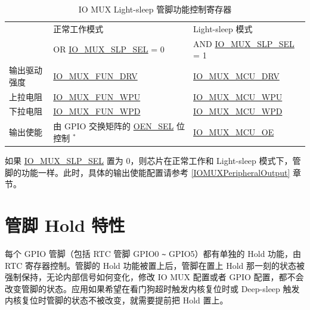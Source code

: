 \documentclass[main\_\_CN.tex]{subfiles}
\begin{document}
\begin{longtable}[c]{|p{3cm}|m{6.5cm}|m{5cm}|}
\caption{IO MUX Light-sleep 管脚功能控制寄存器}
\label{tab:iomuxgpio-pin-function-register-light-sleep-mode} \\
    \hline
    \rowcolor{lightgray}
   & 正常工作模式 & Light-sleep 模式 \\
    \rowcolor{lightgray}
   \multirow{-2}{*}{IO MUX 功能}  & OR \hyperref[fielddesc:IOMUXGPIONSLPSEL]{IO\_MUX\_SLP\_SEL} = 0 & AND \hyperref[fielddesc:IOMUXGPIONSLPSEL]{IO\_MUX\_SLP\_SEL} = 1 \\
    \hline
输出驱动强度 & \hyperref[fielddesc:IOMUXGPIONFUNDRV]{IO\_MUX\_FUN\_DRV} & \hyperref[fielddesc:IOMUXGPIONMCUDRV]{IO\_MUX\_MCU\_DRV} \\ 
\hline
上拉电阻 & \hyperref[fielddesc:IOMUXGPIONFUNWPU]{IO\_MUX\_FUN\_WPU} & \hyperref[fielddesc:IOMUXGPIONMCUWPU]{IO\_MUX\_MCU\_WPU} \\
\hline
下拉电阻 & \hyperref[fielddesc:IOMUXGPIONFUNWPD]{IO\_MUX\_FUN\_WPD} & \hyperref[fielddesc:IOMUXGPIONMCUWPD]{IO\_MUX\_MCU\_WPD} \\
\hline
输出使能 & 由 GPIO 交换矩阵的 \hyperref[fielddesc:GPIOFUNCNOENSEL]{OEN\_SEL} 位控制 $^{*}$ & \hyperref[fielddesc:IOMUXGPIONMCUOE]{IO\_MUX\_MCU\_OE} \\
\hline
\end{longtable}

\begin{tiplisting}
如果 \hyperref[fielddesc:IOMUXGPIONSLPSEL]{IO\_MUX\_SLP\_SEL} 置为 0，则芯片在正常工作和 Light-sleep 模式下，管脚的功能一样。此时，具体的输出使能配置请参考 \ref{IOMUXPeripheralOutput} 章节。

\end{tiplisting}

\section{管脚 Hold 特性}\label{PadHold}

每个 GPIO 管脚（包括 RTC 管脚 GPIO0 \verb+~+ GPIO5）都有单独的 Hold 功能，由 RTC 寄存器控制。管脚的 Hold 功能被置上后，管脚在置上 Hold 那一刻的状态被强制保持，无论内部信号如何变化，修改 IO MUX 配置或者 GPIO 配置，都不会改变管脚的状态。应用如果希望在看门狗超时触发内核复位时或 Deep-sleep 触发内核复位时管脚的状态不被改变，就需要提前把 Hold 置上。
\end{document}
